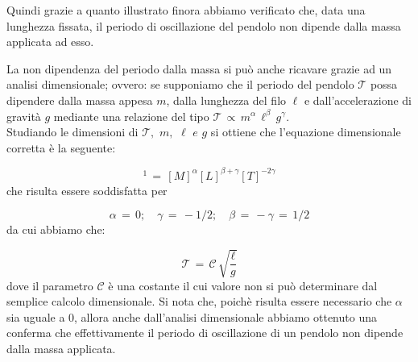Quindi grazie a quanto illustrato finora abbiamo verificato che, data una lunghezza fissata, il periodo di oscillazione del pendolo non dipende dalla massa applicata ad esso.

La non dipendenza del periodo dalla massa si può anche ricavare grazie ad un analisi dimensionale; ovvero: se supponiamo che il periodo del pendolo $\mathcal{T}$ possa dipendere dalla massa appesa $m$, dalla lunghezza del filo $\ell$ e dall'accelerazione di gravità $g$ mediante una relazione del tipo $\mathcal{T} \,\propto\, m^\alpha \, \ell^\beta \, g^\gamma$.\\
Studiando le dimensioni di $\mathcal{T}, \,\, m, \,\, \ell \,\,e\,\, g$ si ottiene che l'equazione dimensionale corretta è la seguente:

\begin{equation*}
	[T]^1 \,=\, [M]^\alpha[L]^{\beta+\gamma}[T]^{-2\gamma}
\end{equation*}
%
che risulta essere soddisfatta per

\begin{equation*}
	\alpha \,=\, 0; \quad \gamma \,=\, -1/2; \quad \beta \,=\, -\gamma \,=\, 1/2 
\end{equation*}
%
da cui abbiamo che:

\begin{equation*}
	\mathcal{T} \,=\, \mathcal{C} \, \sqrt{\frac{\ell}{g}}
\end{equation*}
%
dove il parametro $\mathcal{C}$ è una costante il cui valore non si può determinare dal semplice calcolo dimensionale. Si nota che, poichè risulta essere necessario che $\alpha$ sia uguale a 0, allora anche dall'analisi dimensionale abbiamo ottenuto una conferma che effettivamente il periodo di oscillazione di un pendolo non dipende dalla massa applicata.
